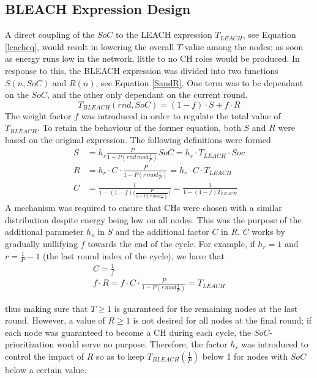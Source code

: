 \subsection{BLEACH Expression Design}
A direct coupling of the $SoC$ to the LEACH expression $T_{LEACH}$, see Equation \ref{leacheq}, would result in lowering the overall $T$-value among the nodes; as soon as energy runs low in the network, little to no CH roles would be produced. In response to this, the BLEACH expression was divided into two functions $S(n, SoC)$ and $R(n)$, see Equation \ref{SandR}. One term was to be dependant on the $SoC$, and the other only dependant on the current round. 
\begin{equation}
    \label{SandR}
    T_{BLEACH}(rnd, SoC) = (1-f)\cdot S + f\cdot R
\end{equation}
The weight factor $f$ was introduced in order to regulate the total value of $T_{BLEACH}$. To retain the behaviour of the former equation, both
$S$ and $R$ were based on the original expression. \newline
The following definitions were formed
\begin{align}
    \label{SandRexpanded}
    S &= h_s\frac{P}{1-P(rnd\,mod\frac{1}{P})}SoC = h_s\cdot T_{LEACH} \cdot Soc\\
    R &= h_r\cdot C \cdot \frac{P}{1-P(r\,mod\frac{1}{P})} = h_r \cdot C \cdot T_{LEACH}\\
    C &= \frac{1}{1-(1-f)\big(\frac{P}{1-P(r\,mod\frac{1}{P})}\big)} = \frac{1}{1-(1-f)T_{LEACH}}
\end{align}
\noindent A mechanism was required to ensure that CHs were chosen with a similar distribution despite energy being low on all nodes. This was the purpose of the additional parameter $h_s$ in $S$ and the additional factor $C$ in $R$. 
$C$ works by gradually nullifying $f$ towards the end of the cycle. For example, if $h_r = 1$ and $r = \frac{1}{P}-1$ (the last round index of the cycle), we have that
\begin{align}
    C = \frac{1}{f} \\
    f\cdot R = f\cdot C \cdot \frac{P}{1-P(r\,mod\frac{1}{P})} = T_{LEACH}
\end{align}

thus making sure that $T\geq1$ is guaranteed for the remaining nodes at the last round. However, a value of $R\geq1$ is not desired for all nodes at the final round; if each node was guaranteed to become a CH during each cycle, the $SoC$-prioritization would serve no purpose. Therefore, the factor $h_r$ was introduced to control the impact of $R$ so as to keep $T_{BLEACH}(\frac{1}{P})$ below 1 for nodes with $SoC$ below a certain value.\newline

